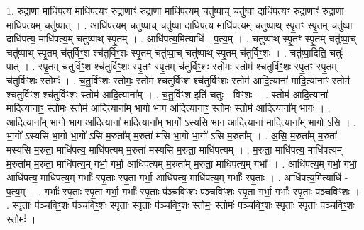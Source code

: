 \documentclass[17pt]{extarticle}
\begin{document}
1. रु॒द्राणा॒ माधि॑पत्य॒ माधि॑पत्यꣳ रु॒द्राणाꣳ॑ रु॒द्राणा॒ माधि॑पत्य॒म् चतु॑ष्पा॒च् चतु॑ष्पा॒ दाधि॑पत्यꣳ रु॒द्राणाꣳ॑ रु॒द्राणा॒ माधि॑पत्य॒म् चतु॑ष्पात् । . आधि॑पत्य॒म् चतु॑ष्पा॒च् चतु॑ष्पा॒ दाधि॑पत्य॒ माधि॑पत्य॒म् चतु॑ष्पाथ् स्पृ॒तꣳ स्पृ॒तम् चतु॑ष्पा॒ दाधि॑पत्य॒ माधि॑पत्य॒म् चतु॑ष्पाथ् स्पृ॒तम् । . आधि॑पत्य॒मित्याधि॑ - प॒त्य॒म् । . चतु॑ष्पाथ् स्पृ॒तꣳ स्पृ॒तम् चतु॑ष्पा॒च् चतु॑ष्पाथ् स्पृ॒तम् च॑तुर्विꣳ॒॒श श्च॑तुर्विꣳ॒॒शः स्पृ॒तम् चतु॑ष्पा॒च् चतु॑ष्पाथ् स्पृ॒तम् च॑तुर्विꣳ॒॒शः । . चतु॑ष्पा॒दिति॒ चतुः॑ - पा॒त् । . स्पृ॒तम् च॑तुर्विꣳ॒॒श श्च॑तुर्विꣳ॒॒शः स्पृ॒तꣳ स्पृ॒तम् च॑तुर्विꣳ॒॒शः स्तोमः॒ स्तोम॑ श्चतुर्विꣳ॒॒शः स्पृ॒तꣳ स्पृ॒तम् च॑तुर्विꣳ॒॒शः स्तोमः॑ । . च॒तु॒र्विꣳ॒॒शः स्तोमः॒ स्तोम॑ श्चतुर्विꣳ॒॒श श्च॑तुर्विꣳ॒॒शः स्तोम॑ आदि॒त्याना॑ मादि॒त्यानाꣳ॒॒ स्तोम॑ श्चतुर्विꣳ॒॒श श्च॑तुर्विꣳ॒॒शः स्तोम॑ आदि॒त्याना᳚म् । . च॒तु॒र्विꣳ॒॒श इति॑ चतुः - विꣳ॒॒शः । . स्तोम॑ आदि॒त्याना॑ मादि॒त्यानाꣳ॒॒ स्तोमः॒ स्तोम॑ आदि॒त्याना᳚म् भा॒गो भा॒ग आ॑दि॒त्यानाꣳ॒॒ स्तोमः॒ स्तोम॑ आदि॒त्याना᳚म् भा॒गः । . आ॒दि॒त्याना᳚म् भा॒गो भा॒ग आ॑दि॒त्याना॑ मादि॒त्याना᳚म् भा॒गो᳚ ऽस्यसि भा॒ग आ॑दि॒त्याना॑ मादि॒त्याना᳚म् भा॒गो॑ ऽसि । . भा॒गो᳚ ऽस्यसि भा॒गो भा॒गो॑ ऽसि म॒रुता᳚म् म॒रुता॑ मसि भा॒गो भा॒गो॑ ऽसि म॒रुता᳚म् । . अ॒सि॒ म॒रुता᳚म् म॒रुता॑ मस्यसि म॒रुता॒ माधि॑पत्य॒ माधि॑पत्यम् म॒रुता॑ मस्यसि म॒रुता॒ माधि॑पत्यम् । . म॒रुता॒ माधि॑पत्य॒ माधि॑पत्यम् म॒रुता᳚म् म॒रुता॒ माधि॑पत्य॒म् गर्भा॒ गर्भा॒ आधि॑पत्यम् म॒रुता᳚म् म॒रुता॒ माधि॑पत्य॒म् गर्भाः᳚ । . आधि॑पत्य॒म् गर्भा॒ गर्भा॒ आधि॑पत्य॒ माधि॑पत्य॒म् गर्भाः᳚ स्पृ॒ताः स्पृ॒ता गर्भा॒ आधि॑पत्य॒ माधि॑पत्य॒म् गर्भाः᳚ स्पृ॒ताः । . आधि॑पत्य॒मित्याधि॑ - प॒त्य॒म् । . गर्भाः᳚ स्पृ॒ताः स्पृ॒ता गर्भा॒ गर्भाः᳚ स्पृ॒ताः प॑ञ्चविꣳ॒॒शः प॑ञ्चविꣳ॒॒शः स्पृ॒ता गर्भा॒ गर्भाः᳚ 
स्पृ॒ताः प॑ञ्चविꣳ॒॒शः । . स्पृ॒ताः प॑ञ्चविꣳ॒॒शः प॑ञ्चविꣳ॒॒शः स्पृ॒ताः स्पृ॒ताः प॑ञ्चविꣳ॒॒शः स्तोमः॒ स्तोमः॑ पञ्चविꣳ॒॒शः स्पृ॒ताः स्पृ॒ताः प॑ञ्चविꣳ॒॒शः स्तोमः॑ । \newline
\end{document}
